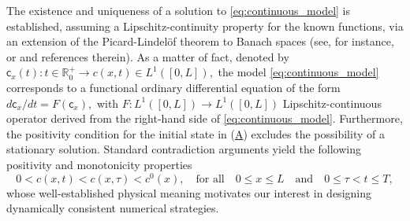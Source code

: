 \documentclass[a4paper, UKenglish, numberwithinsect, thm-restate]{tgdk-v2021}
\begin{document}
The existence and uniqueness of a solution to \eqref{eq:continuous_model} is established, assuming a Lipschitz-continuity property for the known functions, via an extension of the Picard-Lindel\"{o}f theorem to Banach spaces (see, for instance, \cite[Theorem 6]{ODE_Exs} or \cite[Satz 1.17]{Tedesco_Libro} and references therein). 
As a matter of fact, denoted by $\mathsf{c}_x(t) : t\in \mathbb{R}^+_0 \to c(x,t)\in L^1([0,L]),$ the model \eqref{eq:continuous_model} corresponds to a functional ordinary differential equation of the form $d \mathsf{c}_x/dt=F(\mathsf{c}_x), $ with  $F: L^1([0,L])\to L^1([0,L])$ Lipschitz-continuous operator derived from the right-hand side of \eqref{eq:continuous_model}.  Furthermore, the positivity condition for the initial state in (\hyperref[ass:1]{A}) excludes the possibility of a stationary solution. Standard contradiction arguments yield the following positivity and monotonicity properties
\begin{equation}\label{eq:Properties}
   0<c(x,t)<c(x,\tau )< c^0(x), \quad \text{for all} \quad 0\leq x \leq L \quad \text{and} \quad 0\leq \tau <t \leq T,   
\end{equation}
whose well-established physical meaning motivates our interest in designing dynamically consistent numerical strategies.
\end{document}
